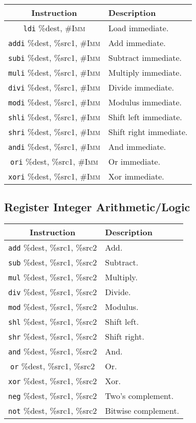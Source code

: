 \documentclass[10pt,letterpaper]{article}
\begin{document}
\begin{center}
\begin{tabular}{cl}
\textbf{Instruction}&\textbf{Description}\\
\hline
\texttt{ldi} \%dest, \textsc{\#Imm}&Load immediate.\\
\texttt{addi} \%dest, \%src1, \textsc{\#Imm}&Add immediate.\\
\texttt{subi} \%dest, \%src1, \textsc{\#Imm}&Subtract immediate.\\
\texttt{muli} \%dest, \%src1, \textsc{\#Imm}&Multiply immediate.\\
\texttt{divi} \%dest, \%src1, \textsc{\#Imm}&Divide immediate.\\
\texttt{modi} \%dest, \%src1, \textsc{\#Imm}&Modulus immediate.\\
\texttt{shli} \%dest, \%src1, \textsc{\#Imm}&Shift left immediate.\\
\texttt{shri} \%dest, \%src1, \textsc{\#Imm}&Shift right immediate.\\
\texttt{andi} \%dest, \%src1, \textsc{\#Imm}&And immediate.\\
\texttt{ori} \%dest, \%src1, \textsc{\#Imm}&Or immediate.\\
\texttt{xori} \%dest, \%src1, \textsc{\#Imm}&Xor immediate.\\
\end{tabular}
\end{center}

\subsection{Register Integer Arithmetic/Logic}
\begin{center}
\begin{tabular}{cl}
\textbf{Instruction}&\textbf{Description}\\
\hline
\texttt{add} \%dest, \%src1, \%src2&Add.\\
\texttt{sub} \%dest, \%src1, \%src2&Subtract.\\
\texttt{mul} \%dest, \%src1, \%src2&Multiply.\\
\texttt{div} \%dest, \%src1, \%src2&Divide.\\
\texttt{mod} \%dest, \%src1, \%src2&Modulus.\\
\texttt{shl} \%dest, \%src1, \%src2&Shift left.\\
\texttt{shr} \%dest, \%src1, \%src2&Shift right.\\
\texttt{and} \%dest, \%src1, \%src2&And.\\
\texttt{or} \%dest, \%src1, \%src2&Or.\\
\texttt{xor} \%dest, \%src1, \%src2&Xor.\\
\texttt{neg} \%dest, \%src1, \%src2&Two's complement.\\
\texttt{not} \%dest, \%src1, \%src2&Bitwise complement.\\
\end{tabular}
\end{center}
\end{document}
